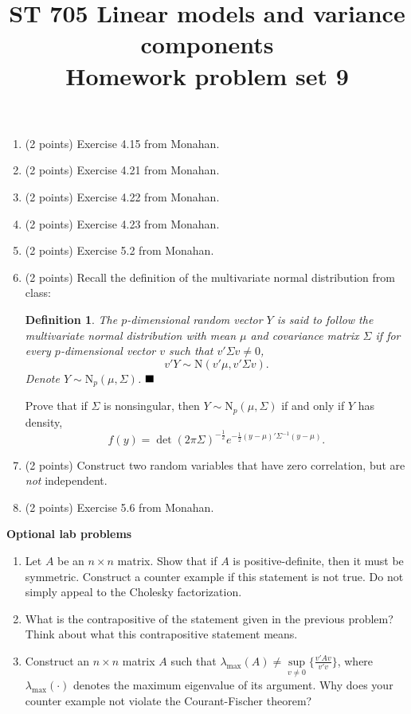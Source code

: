 \documentclass[11pt]{article}
\title{ST 705 Linear models and variance components \\ 
        Homework problem set 9}
\newtheorem{definition}[theorem]{Definition}
\begin{document}
\maketitle

\begin{enumerate}

\item(2 points) Exercise 4.15 from Monahan.

\item(2 points) Exercise 4.21 from Monahan.

\item(2 points) Exercise 4.22 from Monahan.

\item(2 points) Exercise 4.23 from Monahan.

\item(2 points) Exercise 5.2 from Monahan.

\item(2 points) Recall the definition of the multivariate normal distribution from class:

\begin{definition}
The $p$-dimensional random vector $Y$ is said to follow the multivariate normal distribution with mean $\mu$ and covariance matrix $\Sigma$ if for every $p$-dimensional vector $v$ such that $v'\Sigma v \ne 0$,
\[
v'Y \sim \text{N}(v'\mu,v'\Sigma v).
\]
Denote $Y \sim \text{N}_{p}(\mu,\Sigma)$. $\hfill \blacksquare$
\end{definition}
Prove that if $\Sigma$ is nonsingular, then $Y \sim \text{N}_{p}(\mu,\Sigma)$ if and only if $Y$ has density,
\[
f(y) = \det(2\pi\Sigma)^{-\frac{1}{2}}e^{-\frac{1}{2}(y-\mu)'\Sigma^{-1}(y-\mu)}.
\]

\item(2 points) Construct two random variables that have zero correlation, but are {\em not} independent.

\item(2 points) Exercise 5.6 from Monahan.
\end{enumerate}

{\noindent\bf Optional lab problems}

\begin{enumerate}

\item Let $A$ be an $n\times n$ matrix.  Show that if $A$ is positive-definite, then it must be symmetric.  Construct a counter example if this statement is not true.  Do not simply appeal to the Cholesky factorization.

\item What is the contrapositive of the statement given in the previous problem?  Think about what this contrapositive statement means.

\item Construct an $n\times n$ matrix $A$ such that $\lambda_{\max}(A) \ne \sup\limits_{v\ne0}\big\{\frac{v'Av}{v'v}\big\}$, where $\lambda_{\max}(\cdot)$ denotes the maximum eigenvalue of its argument.  Why does your counter example not violate the Courant-Fischer theorem?

\end{enumerate}
\end{document}
